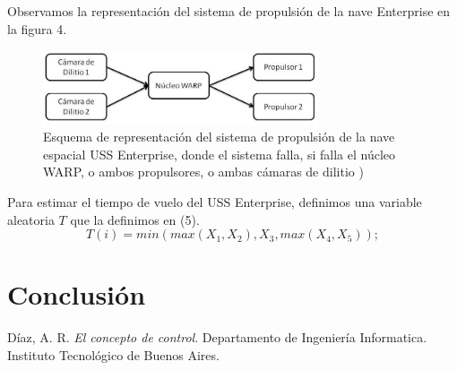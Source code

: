\documentclass[10pt,journal,compsoc]{IEEEtran}
\begin{document}
Observamos la representaci\'on del sistema de propulsi\'on de la nave Enterprise en la figura 4.


\begin{figure}[t]
\label{fig:3d}
\begin{center}
\centering
\includegraphics[width=3.2in]{propulsor.jpg}
\caption{Esquema de representaci\'on del sistema de propulsi\'on de la nave espacial USS Enterprise, donde el sistema falla, si falla el n\'ucleo WARP, o ambos propulsores, o ambas c\'amaras de dilitio ) }
\end{center}
\end{figure}

Para estimar el tiempo de vuelo del USS Enterprise, definimos una variable aleatoria $T$ que la definimos en (5).
\begin{equation}
T(i) = min( max(X_1, X_2), X_3, max(X_4, X_5) );
\end{equation}
%

\section{Conclusi\'on}

\begin{thebibliography}{1}

D\'iaz, A. R. \emph{El concepto de control}. Departamento de Ingenier\'ia Informatica. 
Instituto Tecnol\'ogico de Buenos Aires.
\end{thebibliography}
\end{document}
